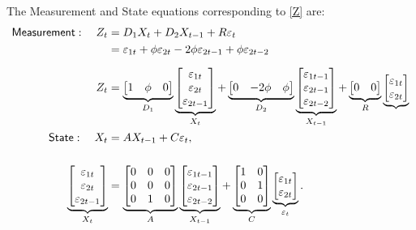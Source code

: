 \documentclass[a4paper,12pt]{article}
\newcommand{\bsq}{\begin{subequations}}\newcommand{\esq}{\end{subequations}}
\begin{document}
The Measurement and State equations corresponding to \ref{Z} are:\bsq\label%
{K0SSM}%
\begin{align}
\mathsf{Measurement}:\quad Z_{t}& =D_{1}X_{t}+D_{2}X_{t-1}+R\varepsilon _{t}
\notag \\
& =\varepsilon _{1t}+\phi \varepsilon _{2t}-2\phi \varepsilon _{2t-1}+\phi
\varepsilon _{2t-2} \\[2mm]
Z_{t}& =\underbrace{%
\begin{bmatrix}
1 & \phi & 0%
\end{bmatrix}%
}_{D_{1}}\underbrace{%
\begin{bmatrix}
\varepsilon _{1t} \\ 
\varepsilon _{2t} \\ 
\varepsilon _{2t-1}%
\end{bmatrix}%
}_{X_{t}}+\underbrace{%
\begin{bmatrix}
0 & -2\phi & \phi%
\end{bmatrix}%
}_{D_{2}}\underbrace{%
\begin{bmatrix}
\varepsilon _{1t-1} \\ 
\varepsilon _{2t-1} \\ 
\varepsilon _{2t-2}%
\end{bmatrix}%
}_{X_{t-1}}+\underbrace{%
\begin{bmatrix}
0 & 0%
\end{bmatrix}%
}_{R}\underbrace{%
\begin{bmatrix}
\varepsilon _{1t} \\ 
\varepsilon _{2t}%
\end{bmatrix}%
} \\
\mathsf{State}:\quad X_{t}& =AX_{t-1}+C\varepsilon _{t},  \notag \\[5mm]
\underbrace{%
\begin{bmatrix}
\varepsilon _{1t} \\ 
\varepsilon _{2t} \\ 
\varepsilon _{2t-1}%
\end{bmatrix}%
}_{X_{t}}& =\underbrace{%
\begin{bmatrix}
0 & 0 & 0 \\ 
0 & 0 & 0 \\ 
0 & 1 & 0%
\end{bmatrix}%
}_{A}\underbrace{%
\begin{bmatrix}
\varepsilon _{1t-1} \\ 
\varepsilon _{2t-1} \\ 
\varepsilon _{2t-2}%
\end{bmatrix}%
}_{X_{t-1}}+\underbrace{%
\begin{bmatrix}
1 & 0 \\ 
0 & 1 \\ 
0 & 0%
\end{bmatrix}%
}_{C}\underbrace{%
\begin{bmatrix}
\varepsilon _{1t} \\ 
\varepsilon _{2t}%
\end{bmatrix}%
}_{\varepsilon _{t}}.
\end{align}%
\esq
\end{document}
